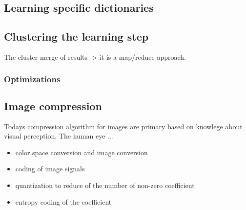 \subsection{Learning specific dictionaries}

\subsection{Clustering the learning step}
The cluster merge of results -> 
it is a map/reduce approach. 

\subsubsection*{Optimizations}

\subsection{Image compression}
Todays compression algorithm for images are primary based on knowlege about visual perception.
The human eye ...

\begin{itemize}
 \item color space conversion and image conversion
 \item coding of image signals
 \item quantization to reduce of the number of non-zero coefficient 
 \item entropy coding of the coefficient 
\end{itemize}



